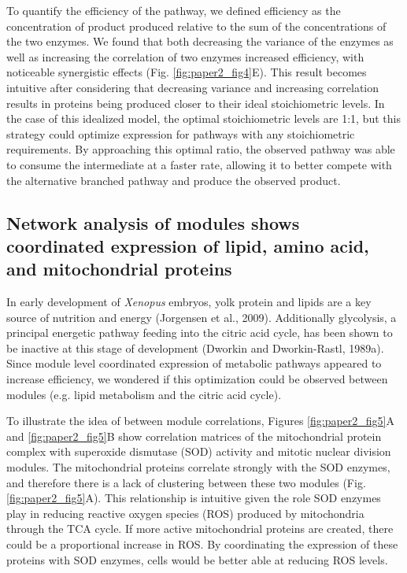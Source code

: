 To quantify the efficiency of the pathway, we defined efficiency as the concentration of product produced relative to the sum of the concentrations of the two enzymes. We found that both decreasing the variance of the enzymes as well as increasing the correlation of two enzymes increased efficiency, with noticeable synergistic effects (Fig. \ref{fig:paper2_fig4}E). This result becomes intuitive after considering that decreasing variance and increasing correlation results in proteins being produced closer to their ideal stoichiometric levels. In the case of this idealized model, the optimal stoichiometric levels are 1:1, but this strategy could optimize expression for pathways with any stoichiometric requirements. By approaching this optimal ratio, the observed pathway was able to consume the intermediate at a faster rate, allowing it to better compete with the alternative branched pathway and produce the observed product.

\subsection{Network analysis of modules shows coordinated expression of lipid, amino acid, and mitochondrial proteins}

In early development of \emph{Xenopus} embryos, yolk protein and lipids are a key source of nutrition and energy (Jorgensen et al., 2009). Additionally glycolysis, a principal energetic pathway feeding into the citric acid cycle, has been shown to be inactive at this stage of development (Dworkin and Dworkin-Rastl, 1989a). Since module level coordinated expression of metabolic pathways appeared to increase efficiency, we wondered if this optimization could be observed between modules (e.g. lipid metabolism and the citric acid cycle).

To illustrate the idea of between module correlations, Figures \ref{fig:paper2_fig5}A and \ref{fig:paper2_fig5}B show correlation matrices of the mitochondrial protein complex with superoxide dismutase (SOD) activity and mitotic nuclear division modules. The mitochondrial proteins correlate strongly with the SOD enzymes, and therefore there is a lack of clustering between these two modules (Fig. \ref{fig:paper2_fig5}A). This relationship is intuitive given the role SOD enzymes play in reducing reactive oxygen species (ROS) produced by mitochondria through the TCA cycle. If more active mitochondrial proteins are created, there could be a proportional increase in ROS. By coordinating the expression of these proteins with SOD enzymes, cells would be better able at reducing ROS levels.

